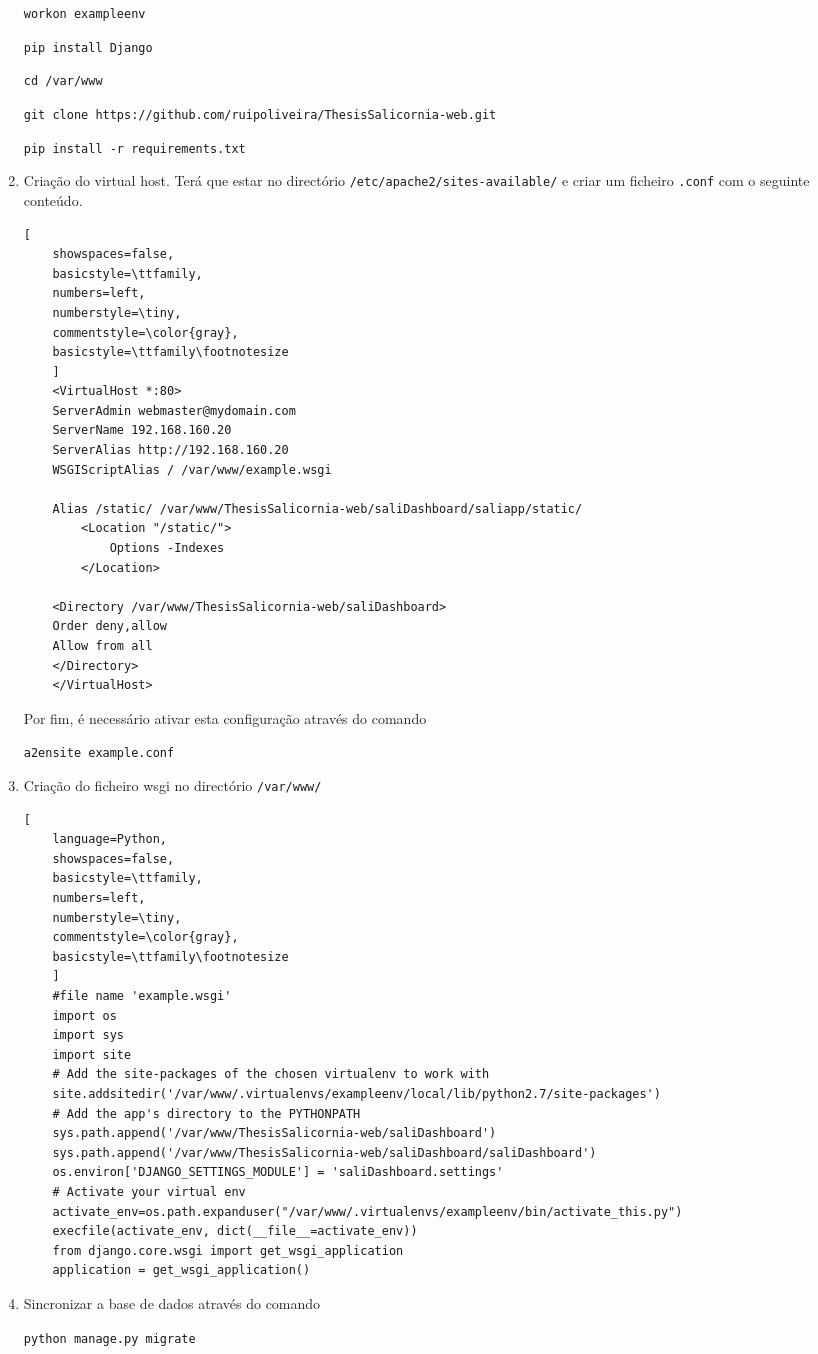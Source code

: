 \begin{enumerate}
	\texttt{workon exampleenv}
	
	\texttt{pip install Django}
	
	\texttt{cd /var/www}
	
	\texttt{git clone https://github.com/ruipoliveira/ThesisSalicornia-web.git}
	
	\texttt{pip install -r requirements.txt}
	
	

	

	\item Criação do virtual host. Terá que estar no directório \texttt{/etc/apache2/sites-available/} e criar um ficheiro \texttt{.conf} com o seguinte conteúdo. 
	
	\begin{lstlisting}[
	showspaces=false,
	basicstyle=\ttfamily,
	numbers=left,
	numberstyle=\tiny,
	commentstyle=\color{gray},
	basicstyle=\ttfamily\footnotesize
	]
	<VirtualHost *:80>
	ServerAdmin webmaster@mydomain.com
	ServerName 192.168.160.20
	ServerAlias http://192.168.160.20
	WSGIScriptAlias / /var/www/example.wsgi
	
	Alias /static/ /var/www/ThesisSalicornia-web/saliDashboard/saliapp/static/
		<Location "/static/">
			Options -Indexes
		</Location> 
	
	<Directory /var/www/ThesisSalicornia-web/saliDashboard>
	Order deny,allow    
	Allow from all
	</Directory>
	</VirtualHost>
	\end{lstlisting}
	
	Por fim, é necessário ativar esta configuração através do comando
	
	\texttt{a2ensite example.conf}
	
	
	\item Criação do ficheiro wsgi no directório \texttt{/var/www/}
	
	\begin{lstlisting}[
	language=Python,
	showspaces=false,
	basicstyle=\ttfamily,
	numbers=left,
	numberstyle=\tiny,
	commentstyle=\color{gray},
	basicstyle=\ttfamily\footnotesize
	]
	#file name 'example.wsgi'
	import os
	import sys
	import site
	# Add the site-packages of the chosen virtualenv to work with
	site.addsitedir('/var/www/.virtualenvs/exampleenv/local/lib/python2.7/site-packages')
	# Add the app's directory to the PYTHONPATH
	sys.path.append('/var/www/ThesisSalicornia-web/saliDashboard')
	sys.path.append('/var/www/ThesisSalicornia-web/saliDashboard/saliDashboard')
	os.environ['DJANGO_SETTINGS_MODULE'] = 'saliDashboard.settings'
	# Activate your virtual env
	activate_env=os.path.expanduser("/var/www/.virtualenvs/exampleenv/bin/activate_this.py")
	execfile(activate_env, dict(__file__=activate_env))
	from django.core.wsgi import get_wsgi_application
	application = get_wsgi_application()\end{lstlisting}
	
	
	\item Sincronizar a base de dados através do comando 
	
	\texttt{python manage.py migrate}
	
	 
	 
	 
\end{enumerate}




